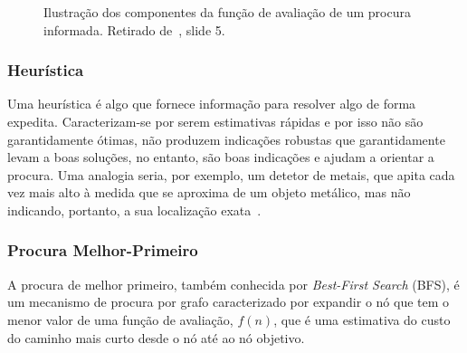 \begin{figure}[H]
    \begin{center}
    \end{center}
    \caption{Ilustração dos componentes da função de avaliação de um procura informada. Retirado de~\cite{isel:iasa:slides:proc-espaco-estados-parte-3}, slide 5.}
    \label{fig:proc-informada}
\end{figure}

\subsubsection{Heurística}\label{subsubsec:heuristica}
Uma heurística é algo que fornece informação para resolver algo de forma expedita.
Caracterizam-se por serem estimativas rápidas e por isso não são garantidamente ótimas, não produzem indicações robustas que garantidamente levam a boas soluções, no entanto, são boas indicações e ajudam a orientar a procura.
Uma analogia seria, por exemplo, um detetor de metais, que apita cada vez mais alto à medida que se aproxima de um objeto metálico, mas não indicando, portanto, a sua localização exata~\cite{ist:leic:resumos:procura-informada}.

\subsubsection{Procura Melhor-Primeiro}\label{subsubsec:procura-melhor-primeiro}

A procura de melhor primeiro, também conhecida por \textit{Best-First Search} (BFS), é um mecanismo de procura por grafo caracterizado por expandir o nó que tem o menor valor de uma função de avaliação, $f(n)$, que é uma estimativa do custo do caminho mais curto desde o nó até ao nó objetivo.

